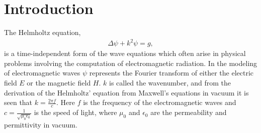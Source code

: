 \documentclass[10pt,a4paper]{article}
\begin{document}
\section*{Introduction}
The Helmholtz equation,
\begin{equation}
\begin{aligned}
\label{Helmholtz}
\Delta \psi + k^2 \psi = g,
\end{aligned}
\end{equation}
is a time-independent form of the wave equations which often arise in physical problems involving the computation of electromagnetic radiation. In the modeling of electromagnetic waves $\psi$ represents the Fourier transform of either the electric field $E$ or the magnetic field $H$. $k$ is called the wavenumber, and from the derivation of the Helmholtz' equation from Maxwell's equations in vacuum it is seen that $k = \frac{2\pi f}{c}$. Here $f$ is the frequency of the electromagnetic waves and $c = \frac{1}{\sqrt{\mu_0 \epsilon_0}}$ is the speed of light, where $\mu_0$ and $\epsilon_0$ are the permeability and permittivity in vacuum.
\end{document}
